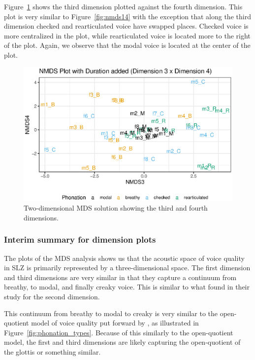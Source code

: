 Figure~\ref{fig:nmds34} shows the third dimension plotted against the fourth dimension. This plot is very similar to Figure~\ref{fig:nmds14} with the exception that along the third dimension checked and rearticulated voice have swapped places. Checked voice is more centralized in the plot, while rearticulated voice is located more to the right of the plot. Again, we observe that the modal voice is located at the center of the plot.

\begin{figure}[!ht]
    \centering
    \includegraphics[width = 0.9\linewidth]{images/MDS/nmds34_dur.eps}
    \caption{Two-dimensional MDS solution showing the third and fourth dimensions.}
    \label{fig:nmds34}
\end{figure}

\subsubsection{Interim summary for dimension plots} \label{sec:acousticlandscape:inter_sum}

The plots of the MDS analysis shows us that the acoustic space of voice quality in SLZ is primarily represented by a three-dimensional space. The first dimension and third dimensions are very similar in that they capture a continuum from breathy, to modal, and finally creaky voice. This is similar to what \citet{keatingCrosslanguageAcousticSpace2023} found in their study for the second dimension. 

This continuum from breathy to modal to creaky is very similar to the open-quotient model of voice quality put forward by \citet{gordonPhonationTypesCrosslinguistic2001}, as illustrated in Figure~\ref{fig:phonation_types}. Because of this similarly to the open-quotient model, the first and third dimensions are likely capturing the open-quotient of the glottis or something similar. 

